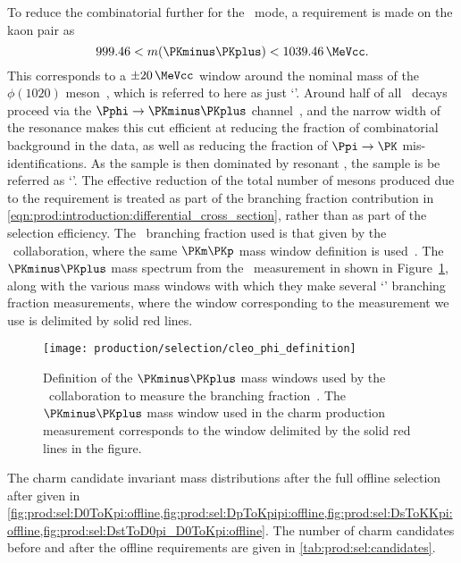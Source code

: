 To reduce the combinatorial further for the \DspToKKpi\ mode, a requirement is 
made on the kaon pair as
\begin{equation}
  999.46 < m(\PKminus\PKplus) < \SI{1039.46}{\MeVcc}.
  \label{eqn:prod:sel:phi_cut}
\end{equation}
This corresponds to a $\pm\SI{20}{\MeVcc}$ window around the nominal mass of 
the $\phi(1020)$ meson~\cite{PDG2014}, which is referred to here as just 
`\Pphi'.
Around half of all \DspToKKpi\ decays proceed via the 
$\decay{\Pphi}{\PKminus\PKplus}$ channel~\cite{PDG2014}, and the narrow width 
of the \Pphi resonance makes this cut efficient at reducing the fraction of 
combinatorial background in the data, as well as reducing the fraction of $\Ppi 
\to \PK$ mis-identifications.
As the \DspToKKpi sample is then dominated by resonant \DspTophipi, the 
\PDsplus sample is be referred as `\DspTophipi'.
The effective reduction of the total number of \PDsplus mesons produced due to 
the \Pphi requirement is treated as part of the branching fraction contribution 
in \cref{eqn:prod:introduction:differential_cross_section}, rather than as part 
of the selection efficiency.
The \DspTophipi\ branching fraction used is that given by the \cleo\ 
collaboration, where the same $\PKm\PKp$ mass window definition is 
used~\cite{Alexander:2008aa}.
The $\PKminus\PKplus$ mass spectrum from the \cleo\ measurement in shown in 
Figure~\ref{fig:sel:offline:cleo_phi}, along with the various mass windows with 
which they make several `\DspTophipi' branching fraction measurements, where 
the window corresponding to the measurement we use is delimited by solid red 
lines.

\begin{figure}
  \texttt{[image: production/selection/cleo\_phi\_definition]}
  \caption{%
    Definition of the $\PKminus\PKplus$ mass windows used by the \cleo\ 
    collaboration to measure the \DspTophipi branching 
    fraction~\cite{Alexander:2008aa}.
    The $\PKminus\PKplus$ mass window used in the charm production measurement 
    corresponds to the window delimited by the solid red lines in the figure.
  }
  \label{fig:sel:offline:cleo_phi}
\end{figure}

The charm candidate invariant mass distributions after the full offline 
selection after given in 
\cref{fig:prod:sel:D0ToKpi:offline,fig:prod:sel:DpToKpipi:offline,fig:prod:sel:DsToKKpi:offline,fig:prod:sel:DstToD0pi_D0ToKpi:offline}.
The number of charm candidates before and after the offline requirements are 
given in \cref{tab:prod:sel:candidates}.

